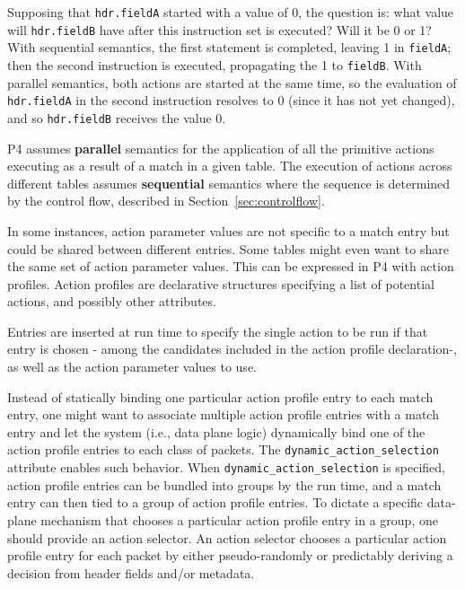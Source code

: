 \documentclass[12pt]{article}
\begin{document}
Supposing that \texttt{hdr.fieldA} started with a value of 0, the question is: what 
value will \texttt{hdr.fieldB} have after this instruction set is executed? Will 
it be 0 or 1? With sequential semantics, the first statement is completed, 
leaving 1 in \texttt{fieldA}; then the second instruction is executed, propagating 
the 1 to \texttt{fieldB}.  With parallel semantics, both actions are started at the 
same time, so the evaluation of \texttt{hdr.fieldA} in the second instruction resolves 
to 0 (since it has not yet changed), and so \texttt{hdr.fieldB} receives the value 
0.

P4 assumes \textbf{parallel} semantics for the application of all the primitive actions 
executing as a result of a match in a given table. The execution of actions 
across different tables assumes \textbf{sequential} semantics where the sequence is 
determined by the control flow, described in Section~\ref{sec:controlflow}.


In some instances, action parameter values are not specific to a match entry but
could be shared between different entries. Some tables might even want to share
the same set of action parameter values. This can be expressed in P4 with
action profiles.
Action profiles are declarative structures specifying a list of potential
actions, and possibly other attributes.

Entries are inserted at run time to specify the single action to be run if that
entry is chosen - among the candidates included in the action profile
declaration-, as well as the action parameter values to use.

Instead of statically binding one particular action profile entry to each match
entry, one might want to associate multiple action profile entries with a match
entry and let the system (i.e., data plane logic) dynamically bind one of the
action profile entries to each class of packets. The
\texttt{dynamic_action_selection} attribute enables such behavior. When
\texttt{dynamic_action_selection} is specified, action profile entries can be
bundled into groups by the run time, and a match entry can then tied to a group
of action profile entries. To dictate a specific data-plane mechanism that
chooses a particular action profile entry in a group, one should provide an
action selector. An action selector chooses a particular action profile entry
for each packet by either pseudo-randomly or predictably deriving a decision
from header fields and/or metadata.
\end{document}
